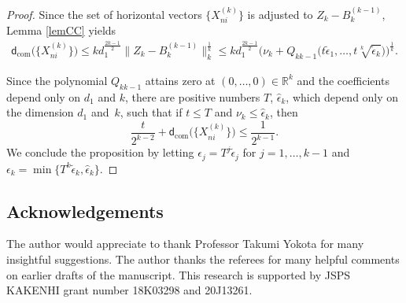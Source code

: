 \documentclass[pdftex]{sigma}
\numberwithin{equation}{section}
\newcommand{\R}{\mathbb{R}}
\begin{document}
\begin{proof}
Since the set of horizontal vectors $\bigl\{X_{ni}^{(k)}\bigr\}$ is adjusted to $Z_k-B_k^{(k-1)}$,
Lemma \ref{lemCC} yields
\begin{gather*}
\mathsf{d}_{\mathrm{com}}\big(\bigl\{X_{ni}^{(k)}\bigr\}\big)\leq kd_1^{\frac{2k-1}{2}}\big\|Z_k-B_k^{(k-1)}\big\|_k^{\frac{1}{k}}
\leq kd_1^{\frac{2k-1}{2}}\big(\nu_k+Q_{kk-1}\big(t\tilde{\epsilon}_1, \dots,t\sqrt[k]{\tilde{\epsilon}_{k}}\big)\big)^{\frac{1}{k}}.
\end{gather*}

Since the polynomial $Q_{kk-1}$ attains zero at $(0,\dots,0)\in \R^{k}$ and the coefficients depend only on $d_1$ and $k$,
there are positive numbers $T$, $\hat{\epsilon}_k$,
which depend only on the dimension $d_1$ and~$k$,
such that if $t\leq T$ and $\nu_k\leq \hat{\epsilon}_k$,
then
\[
\frac{t}{2^{k-2}}+\mathsf{d}_{\mathrm{com}}\big(\bigl\{X_{ni}^{(k)}\bigr\}\big)\leq \frac{1}{2^{k-1}}.
\]
We conclude the proposition by letting $\epsilon_j=T^j\tilde{\epsilon}_j$ for $j=1,\dots,k-1$ and $\epsilon_k=\min\big\{T^k\tilde{\epsilon}_k,\hat{\epsilon}_k\big\}$.
\end{proof}


\subsection*{Acknowledgements}

The author would appreciate to thank Professor Takumi Yokota for many insightful suggestions.
The author thanks the referees for many helpful comments on earlier drafts of the manuscript.
This research is supported by JSPS KAKENHI grant number 18K03298 and 20J13261.
\end{document}
